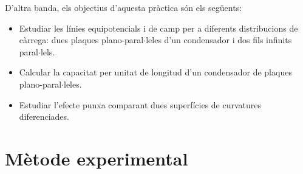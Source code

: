 D'altra banda, els objectius d'aquesta pràctica són els següents:
\begin{itemize}
\item Estudiar les línies equipotencials i de camp per a diferents distribucions de càrrega: dues plaques plano-paral$\cdot$leles d'un condensador i dos fils infinits paral$\cdot$lels.
\item Calcular la capacitat per unitat de longitud d'un condensador de plaques plano-paral$\cdot$leles.
\item Estudiar l'efecte punxa comparant dues superfícies de curvatures diferenciades.
\end{itemize}
\section{Mètode experimental}

